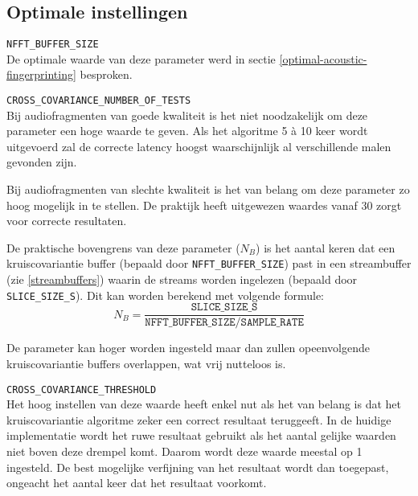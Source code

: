 \subsection{Optimale instellingen}
\begin{description}	
	\item\texttt{NFFT\_BUFFER\_SIZE} \hfill \\
	De optimale waarde van deze parameter werd in sectie \ref{optimal-acoustic-fingerprinting} besproken.
	
	\item\texttt{CROSS\_COVARIANCE\_NUMBER\_OF\_TESTS} \hfill \\
	Bij audiofragmenten van goede kwaliteit is het niet noodzakelijk om deze parameter een hoge waarde te geven. Als het algoritme 5 à 10 keer wordt uitgevoerd zal de correcte latency hoogst waarschijnlijk al verschillende malen gevonden zijn. 
	
	Bij audiofragmenten van slechte kwaliteit is het van belang om deze parameter zo hoog mogelijk in te stellen. De praktijk heeft uitgewezen waardes vanaf 30 zorgt voor correcte resultaten.
	
	De praktische bovengrens van deze parameter ($ N_B $) is het aantal keren dat een kruiscovariantie buffer (bepaald door \texttt{NFFT\_BUFFER\_SIZE}) past in een streambuffer (zie \ref{streambuffers}) waarin de streams worden ingelezen (bepaald door \texttt{SLICE\_SIZE\_S}). Dit kan worden berekend met volgende formule:
	\begin{equation}
		N_B = \frac{\texttt{SLICE\_SIZE\_S}}{\texttt{NFFT\_BUFFER\_SIZE} / \texttt{SAMPLE\_RATE}}
	\end{equation}
	
	De parameter kan hoger worden ingesteld maar dan zullen opeenvolgende kruiscovariantie buffers overlappen, wat vrij nutteloos is. \\
	
	\item\texttt{CROSS\_COVARIANCE\_THRESHOLD} \hfill \\
	Het hoog instellen van deze waarde heeft enkel nut als het van belang is dat het kruiscovariantie algoritme zeker een correct resultaat teruggeeft. In de huidige implementatie wordt het ruwe resultaat gebruikt als het aantal gelijke waarden niet boven deze drempel komt. Daarom wordt deze waarde meestal op 1 ingesteld. De best mogelijke verfijning van het resultaat wordt dan toegepast, ongeacht het aantal keer dat het resultaat voorkomt. 
\end{description}


